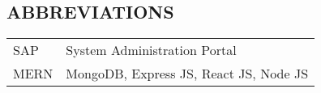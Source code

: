 \renewcommand{\cftloftitlefont}{\hfill\Large\bfseries\MakeUppercase}
\renewcommand{\cftafterloftitle}{\hfill}
\listoffigures
{}
\newpage
\begin{center}
\section*{ABBREVIATIONS}
\begin{table}[h]
    \begin{tabular}{l l}
         SAP & \hspace{2in} System Administration Portal \vspace{2mm} \\
         MERN & \hspace{2in} MongoDB, Express JS, React JS, Node JS \vspace{2mm} \\
    \end{tabular}
\end{table}
\end{center}
\newpage
